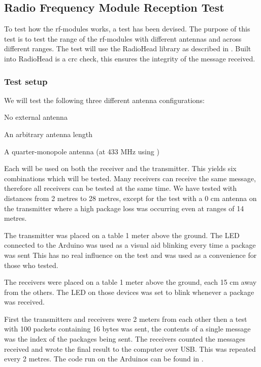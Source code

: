 \subsection{Radio Frequency Module Reception Test} %
\label{cha:radio_frequency_module_reception_test}
To test how the \gls{rf}-modules works, a test has been devised. 
The purpose of this test is to test the range of the \gls{rf}-modules with different antennas and across different ranges. 
The test will use the RadioHead library as described in . 
Built into RadioHead is a \gls{crc} check, this ensures the integrity of the message received. 

\subsubsection*{Test setup}
We will test the following three different antenna configurations: 
\begin{description}[labelindent=\parindent, labelwidth=\widthof{\bfseries 17.3 cm}, align=parright]
    \item[0 cm] No external antenna
    \item[12 cm] An arbitrary antenna length
    \item[17.3 cm] A quarter-monopole antenna (at 433 MHz using )  
\end{description}
Each will be used on both the receiver and the transmitter. 
This yields six combinations which will be tested. 
Many receivers can receive the same message, therefore all receivers can be tested at the same time. 
We have tested with distances from 2 metres to 28 metres, except for the test with a 0 cm antenna on the transmitter where a high package loss was occurring even at ranges of 14 metres. 

The transmitter was placed on a table 1 meter above the ground.
The LED connected to the Arduino was used as a visual aid blinking every time a package was sent
This has no real influence on the test and was used as a convenience for those who tested.

The receivers were placed on a table 1 meter above the ground, each 15 cm away from the others.
The LED on those devices was set to blink whenever a package was received.

First the transmitters and receivers were 2 meters from each other then a test with 100 packets containing 16 bytes was sent, the contents of a single message was the index of the packages being sent. 
The receivers counted the messages received and wrote the final result to the computer over USB. 
This was repeated every 2 metres. 
The code run on the Arduinos can be found in .  


